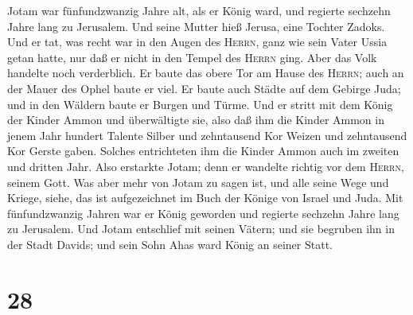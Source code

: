  Jotam war fünfundzwanzig Jahre alt, als er König ward,
und regierte sechzehn Jahre lang zu Jerusalem. Und seine Mutter hieß
Jerusa, eine Tochter Zadoks.  Und er tat, was recht war in
den Augen des \textsc{Herrn}, ganz wie sein Vater Ussia getan hatte, nur
daß er nicht in den Tempel des \textsc{Herrn} ging. Aber das Volk
handelte noch verderblich.  Er baute das obere Tor am
Hause des \textsc{Herrn}; auch an der Mauer des Ophel baute er viel.
 Er baute auch Städte auf dem Gebirge Juda; und in den
Wäldern baute er Burgen und Türme.  Und er stritt mit dem
König der Kinder Ammon und überwältigte sie, also daß ihm die Kinder
Ammon in jenem Jahr hundert Talente Silber und zehntausend Kor Weizen
und zehntausend Kor Gerste gaben. Solches entrichteten ihm die Kinder
Ammon auch im zweiten und dritten Jahr.  Also erstarkte
Jotam; denn er wandelte richtig vor dem \textsc{Herrn}, seinem Gott.
 Was aber mehr von Jotam zu sagen ist, und alle seine Wege
und Kriege, siehe, das ist aufgezeichnet im Buch der Könige von Israel
und Juda.  Mit fünfundzwanzig Jahren war er König geworden
und regierte sechzehn Jahre lang zu Jerusalem.  Und Jotam
entschlief mit seinen Vätern; und sie begruben ihn in der Stadt Davids;
und sein Sohn Ahas ward König an seiner Statt.

\hypertarget{section-27}{%
\section{28}\label{section-27}}

